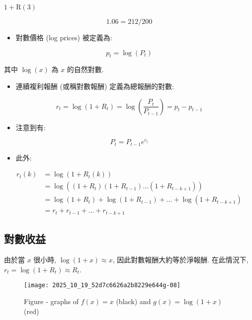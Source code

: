 \documentclass[letterpaper]{article}
\begin{document}
		$1+\mathrm{R} (3) $
		
		$$
		1.06=212 / 200
		$$
		
		\begin{itemize}
			\item 對數價格 (log prices) 被定義為: 
		\end{itemize}
		
		$$
		p_{t}=\log \left (P_{t}\right) 
		$$
		
		其中 $\log (x) $ 為 $x$ 的自然對數. 
		
		\begin{itemize}
			\item 連續複利報酬 (或稱對數報酬) 定義為總報酬的對數: 
		\end{itemize}
		
		$$
		r_{t}=\log \left (1+R_{t}\right) =\log \left (\frac{P_{t}}{P_{t-1}}\right) =p_{t}-p_{t-1}
		$$
		
		\begin{itemize}
			\item 注意到有: 
		\end{itemize}
		
		$$
		P_{t}=P_{t-1} e^{r_{t}}
		$$
		
		\begin{itemize}
			\item 此外: 
		\end{itemize}
		
		$$
		\begin{aligned}
			r_{t} (k) & =\log \left (1+R_{t} (k) \right) \\
			& =\log \left (\left (1+R_{t}\right) \left (1+R_{t-1}\right) \ldots\left (1+R_{t-k+1}\right) \right) \\
			& =\log \left (1+R_{t}\right) +\log \left (1+R_{t-1}\right) +\ldots+\log \left (1+R_{t-k+1}\right) \\
			& =r_{t}+r_{t-1}+\ldots+r_{t-k+1}
		\end{aligned}
		$$
		
		\subsection{對數收益}
		由於當 $x$ 很小時, $\log (1+x) \approx x$, 因此對數報酬大約等於淨報酬. 在此情況下, $r_{t} = \log (1+R_{t}) \approx R_{t}$. 
		
		\begin{figure}[h]
			\begin{center}
				
				\caption{Figure - graphs of $f (x) =x$ (black) and $g (x) =\log (1+x) $ (red) }
				\texttt{[image: 2025\_10\_19\_52d7c6626a2b8229e644g-08]}
				
			\end{center}
		\end{figure}
		
\end{document}
